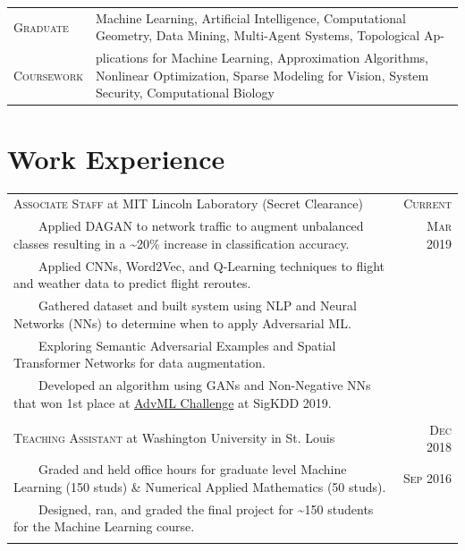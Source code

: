 \documentclass{article}
\newcommand{\tabitem}{~~\llap{\textbullet}~~}
\newcommand{\custombold}[1]{\color{subheadings}\fontspec[Path = fonts/lato/]{Lato-Reg}\selectfont #1 \normalfont}
\begin{document}
\begin{tabularx}{\textwidth}{lX}
\textsc{Graduate} & Machine Learning, Artificial Intelligence, Computational Geometry, Data Mining, Multi-Agent Systems, Topological Ap-\\
\textsc{Coursework} & plications for Machine Learning, Approximation Algorithms, Nonlinear Optimization, Sparse Modeling for Vision, System Security, Computational Biology
\end{tabularx}
\fi

\vspace{17pt}\section{Work Experience}
\begin{tabularx}{\textwidth}{X|r}

\large{\textsc{Associate Staff} at \custombold{MIT Lincoln Laboratory}} (Secret Clearance)& \textsc{Current}\\
\tabitem Applied DAGAN to network traffic to augment unbalanced classes resulting in a \textasciitilde 20\% increase in classification accuracy. & \textsc{Mar} 2019\\
\tabitem Applied CNNs, Word2Vec, and Q-Learning techniques to flight and weather data to predict flight reroutes. \\
\tabitem Gathered dataset and built system using NLP and Neural Networks (NNs) to determine when to apply Adversarial ML. \\
\tabitem Exploring Semantic Adversarial Examples and Spatial Transformer Networks for data augmentation. \\
\tabitem Developed an algorithm using GANs and Non-Negative NNs that won 1st place at \href{https://sites.google.com/view/advml/advml19-challenge}{AdvML Challenge} at SigKDD 2019.\\
\multicolumn{2}{c}{\vspace{-5pt}}\\

\large{\textsc{Teaching Assistant} at \custombold{Washington University in St. Louis}} & \textsc{Dec} 2018\\
\tabitem Graded and held office hours for graduate level Machine Learning (150 studs) \& Numerical Applied Mathematics (50 studs). & \textsc{Sep} 2016\\
\tabitem Designed, ran, and graded the final project for \textasciitilde 150 students for the Machine Learning course.\\
\multicolumn{2}{c}{\vspace{-5pt}} \\


\end{tabularx}
\end{document}
